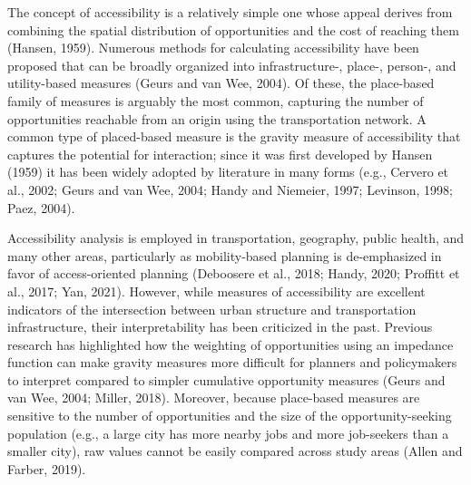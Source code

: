 \documentclass[]{elsarticle} %
\begin{document}
The concept of accessibility is a relatively simple one whose appeal
derives from combining the spatial distribution of opportunities and the
cost of reaching them (Hansen, 1959). Numerous methods for calculating
accessibility have been proposed that can be broadly organized into
infrastructure-, place-, person-, and utility-based measures (Geurs and
van Wee, 2004). Of these, the place-based family of measures is arguably
the most common, capturing the number of opportunities reachable from an
origin using the transportation network. A common type of placed-based
measure is the gravity measure of accessibility that captures the
potential for interaction; since it was first developed by Hansen (1959)
it has been widely adopted by literature in many forms (e.g., Cervero et
al., 2002; Geurs and van Wee, 2004; Handy and Niemeier, 1997; Levinson,
1998; Paez, 2004).

Accessibility analysis is employed in transportation, geography, public
health, and many other areas, particularly as mobility-based planning is
de-emphasized in favor of access-oriented planning (Deboosere et al.,
2018; Handy, 2020; Proffitt et al., 2017; Yan, 2021). However, while
measures of accessibility are excellent indicators of the intersection
between urban structure and transportation infrastructure, their
interpretability has been criticized in the past. Previous research has
highlighted how the weighting of opportunities using an impedance
function can make gravity measures more difficult for planners and
policymakers to interpret compared to simpler cumulative opportunity
measures (Geurs and van Wee, 2004; Miller, 2018). Moreover, because
place-based measures are sensitive to the number of opportunities and
the size of the opportunity-seeking population (e.g., a large city has
more nearby jobs and more job-seekers than a smaller city), raw values
cannot be easily compared across study areas (Allen and Farber, 2019).
\end{document}

